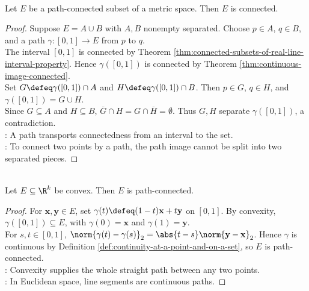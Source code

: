 \begin{theorem} \label{thm:path-connected-implies-connected} \\
Let $E$ be a path-connected subset of a metric space. Then $E$ is connected.
\begin{proof}
Suppose $E=A\cup B$ with $A,B$ nonempty separated. Choose $p\in A$, $q\in B$, and a path $\gamma:[0,1]\to E$ from $p$ to $q$.\\
The interval $[0,1]$ is connected by Theorem \ref{thm:connected-subsets-of-real-line-interval-property}. Hence $\gamma([0,1])$ is connected by Theorem \ref{thm:continuous-image-connected}.\\
Set $G\defeq\gamma([0,1])\cap A$ and $H\defeq\gamma([0,1])\cap B$. Then $p\in G$, $q\in H$, and $\gamma([0,1])=G\cup H$.\\
Since $G\subseteq A$ and $H\subseteq B$, $\overline{G}\cap H=G\cap\overline{H}=\emptyset$. Thus $G,H$ separate $\gamma([0,1])$, a contradiction.\\
: A path transports connectedness from an interval to the set.\\
: To connect two points by a path, the path image cannot be split into two separated pieces.
\end{proof}
\end{theorem}

\begin{corollary} \label{cor:convex-sets-path-connected} \\
Let $E\subseteq\R^k$ be convex. Then $E$ is path-connected.
\begin{proof}
For $\mathbf{x},\mathbf{y}\in E$, set $\gamma(t)\defeq(1-t)\mathbf{x}+t\mathbf{y}$ on $[0,1]$. By convexity, $\gamma([0,1])\subseteq E$, with $\gamma(0)=\mathbf{x}$ and $\gamma(1)=\mathbf{y}$.\\
For $s,t\in[0,1]$, $\norm{\gamma(t)-\gamma(s)}_2=\abs{t-s}\norm{\mathbf{y}-\mathbf{x}}_2$. Hence $\gamma$ is continuous by Definition \ref{def:continuity-at-a-point-and-on-a-set}, so $E$ is path-connected.\\
: Convexity supplies the whole straight path between any two points.\\
: In Euclidean space, line segments are continuous paths.
\end{proof}
\end{corollary}
